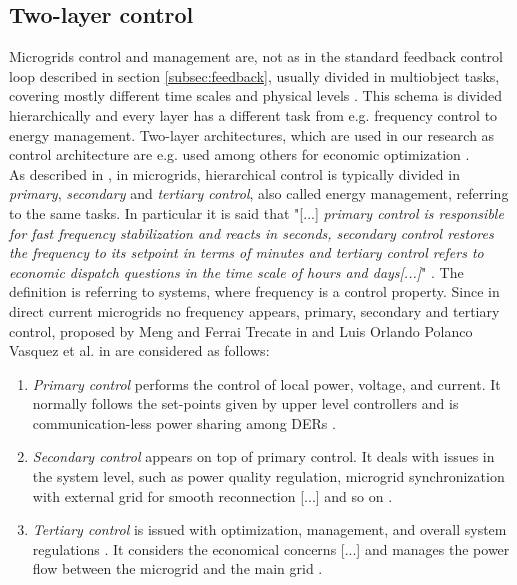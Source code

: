 \subsection{Two-layer control}
\label{subsec:twolayer}
Microgrids control and management are, not as in the standard feedback control loop described in section \ref{subsec:feedback}, usually divided in multiobject tasks, covering mostly different time scales and physical levels \cite{controldc}. This schema is divided hierarchically and every layer has a different task from e.g. frequency control to energy management. Two-layer architectures, which are used in our research as control architecture are e.g. used among others for economic optimization \cite{hier_control}.\\
As described in \cite{paperilc}, in microgrids, hierarchical control is
typically divided in \textit{primary}, \textit{secondary} and \textit{tertiary control}, also called energy management, referring to the same
tasks. In particular it is said that "[...] \textit{primary control is responsible for fast frequency
stabilization and reacts in seconds, secondary control restores the frequency to its setpoint in terms of minutes
and tertiary control refers to economic dispatch questions
in the time scale of hours and days[...]}" \cite{paperilc}. The definition is referring to systems, where frequency is a control property. Since in direct current microgrids no frequency appears, primary, secondary and tertiary control, proposed by Meng and Ferrai Trecate in \cite{controldc} and Luis Orlando Polanco Vasquez et al. in \cite{controldc_energy_man} are considered as follows: 
\begin{enumerate}
    \item \textit{Primary control} performs the control of local power,
    voltage, and current. It normally follows the set-points
    given by upper level controllers and is communication-less power sharing among DERs \cite{controldc}. 
    \item \textit{Secondary control} appears on top of primary control.
    It deals with issues in the system level, such as power quality regulation, microgrid synchronization with external grid for smooth reconnection [...] and so on \cite{controldc}.
    \item \textit{Tertiary control} is issued with optimization, management, and overall system regulations \cite{controldc}. It considers the economical concerns [...] and manages the power flow between the microgrid and the main grid \cite{controldc_energy_man}.
\end{enumerate}
